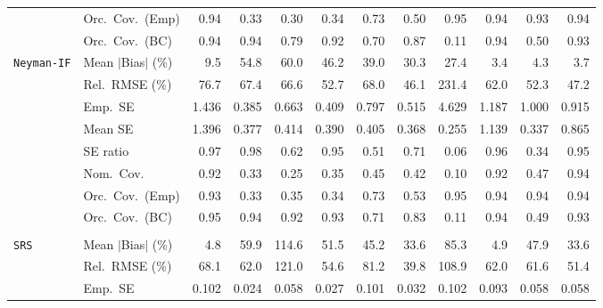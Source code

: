 \begin{landscape}
\begin{longtable}{llrrrrrrrrrr}
 & Orc.\ Cov.\ (Emp) & \cellcolor{ranktwo}0.94 & 0.33 & 0.30 & 0.34 & 0.73 & 0.50 & \cellcolor{rankone}0.95 & \cellcolor{ranktwo}0.94 & \cellcolor{rankthree}0.93 & \cellcolor{ranktwo}0.94 \\
 & Orc.\ Cov.\ (BC) & \cellcolor{rankone}0.94 & \cellcolor{rankone}0.94 & 0.79 & \cellcolor{rankthree}0.92 & 0.70 & 0.87 & 0.11 & \cellcolor{rankone}0.94 & 0.50 & \cellcolor{ranktwo}0.93 \\
\addlinespace[2pt]
\quad \texttt{Neyman-IF} & Mean $|$Bias$|$ (\%) & 9.5 & 54.8 & 60.0 & 46.2 & 39.0 & 30.3 & 27.4 & \cellcolor{rankone}3.4 & \cellcolor{rankthree}4.3 & \cellcolor{ranktwo}3.7 \\
 & Rel.\ RMSE (\%) & 76.7 & 67.4 & 66.6 & 52.7 & 68.0 & \cellcolor{rankone}46.1 & 231.4 & 62.0 & \cellcolor{rankthree}52.3 & \cellcolor{ranktwo}47.2 \\
 & Emp.\ SE & 1.436 & 0.385 & 0.663 & 0.409 & 0.797 & 0.515 & 4.629 & 1.187 & 1.000 & 0.915 \\
 & Mean SE & 1.396 & 0.377 & 0.414 & 0.390 & 0.405 & 0.368 & 0.255 & 1.139 & 0.337 & 0.865 \\
 & SE ratio & \cellcolor{ranktwo}0.97 & \cellcolor{rankone}0.98 & 0.62 & 0.95 & 0.51 & 0.71 & 0.06 & \cellcolor{rankthree}0.96 & 0.34 & 0.95 \\
 & Nom.\ Cov. & \cellcolor{ranktwo}0.92 & 0.33 & 0.25 & 0.35 & 0.45 & 0.42 & 0.10 & \cellcolor{ranktwo}0.92 & \cellcolor{rankthree}0.47 & \cellcolor{rankone}0.94 \\
 & Orc.\ Cov.\ (Emp) & \cellcolor{rankthree}0.93 & 0.33 & 0.35 & 0.34 & 0.73 & 0.53 & \cellcolor{rankone}0.95 & \cellcolor{ranktwo}0.94 & \cellcolor{ranktwo}0.94 & \cellcolor{ranktwo}0.94 \\
 & Orc.\ Cov.\ (BC) & \cellcolor{rankone}0.95 & \cellcolor{ranktwo}0.94 & 0.92 & \cellcolor{rankthree}0.93 & 0.71 & 0.83 & 0.11 & \cellcolor{ranktwo}0.94 & 0.49 & \cellcolor{rankthree}0.93 \\
\addlinespace[2pt]
\multicolumn{12}{l}{\textbf{Interaction}} \\
\addlinespace[2pt]
\quad \texttt{SRS} & Mean $|$Bias$|$ (\%) & \cellcolor{rankone}4.8 & 59.9 & 114.6 & 51.5 & 45.2 & \cellcolor{rankthree}33.6 & 85.3 & \cellcolor{ranktwo}4.9 & 47.9 & \cellcolor{rankthree}33.6 \\
 & Rel.\ RMSE (\%) & 68.1 & 62.0 & 121.0 & \cellcolor{rankthree}54.6 & 81.2 & \cellcolor{rankone}39.8 & 108.9 & 62.0 & 61.6 & \cellcolor{ranktwo}51.4 \\
 & Emp.\ SE & 0.102 & 0.024 & 0.058 & 0.027 & 0.101 & 0.032 & 0.102 & 0.093 & 0.058 & 0.058 \\

\end{longtable}
\end{landscape}
